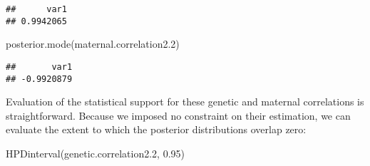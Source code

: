 \documentclass[
  12pt,
]{book}
\newenvironment{Shaded}{\begin{snugshade}}{\end{snugshade}}
\newcommand{\FloatTok}[1]{\textcolor[rgb]{0.00,0.00,0.81}{#1}}
\newcommand{\FunctionTok}[1]{\textcolor[rgb]{0.00,0.00,0.00}{#1}}
\newcommand{\NormalTok}[1]{#1}
\newcommand{\OtherTok}[1]{\textcolor[rgb]{0.56,0.35,0.01}{#1}}
\newcommand{\SpecialCharTok}[1]{\textcolor[rgb]{0.00,0.00,0.00}{#1}}
\newcommand{\StringTok}[1]{\textcolor[rgb]{0.31,0.60,0.02}{#1}}
\begin{document}
\begin{Shaded}
\end{Shaded}

\begin{verbatim}
##      var1 
## 0.9942065
\end{verbatim}

\begin{Shaded}
\begin{Highlighting}[]
\FunctionTok{posterior.mode}\NormalTok{(maternal.correlation2}\FloatTok{.2}\NormalTok{)}
\end{Highlighting}
\end{Shaded}

\begin{verbatim}
##       var1 
## -0.9920879
\end{verbatim}

Evaluation of the statistical support for these genetic and maternal correlations is straightforward. Because we imposed no constraint on their estimation, we can evaluate the extent to which the posterior distributions overlap zero:

\begin{Shaded}
\begin{Highlighting}[]
\FunctionTok{HPDinterval}\NormalTok{(genetic.correlation2}\FloatTok{.2}\NormalTok{, }\FloatTok{0.95}\NormalTok{)}
\end{Highlighting}
\end{Shaded}
\end{document}
